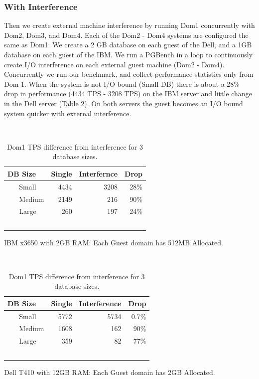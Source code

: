 \subsubsection{With Interference}
Then we create external machine interference by running Dom1 concurrently with Dom2, Dom3, and Dom4. Each of the Dom2 - Dom4 systems are configured the same as Dom1.  We create a 2 GB database on each guest of the Dell, and a 1GB database on each guest of the IBM.  We run a PGBench in a loop to continuously create I/O interference on each external guest machine (Dom2 - Dom4). Concurrently we run our benchmark, and collect performance statistics only from Dom-1.  When the system is not I/O bound (Small DB) there is about a 28\% drop in performance (4434 TPS - 3208 TPS) on the IBM server and little change in the Dell server (Table \ref{fig:tps1}).  On both servers the guest becomes an I/O bound system quicker with external interference.

\begin{table}[h]
\begin{subtable}[h]{0.45\textwidth}
  \begin{tabular}{ l | r | r | r }
    DB Size & Single & Interfernce & Drop \\
    \hline
    Small & 4434 & 3208 & 28\% \\ \hline
    Medium & 2149 & 216 & 90\% \\ \hline
    Large & 260 & 197 & 24\% \\  \hline
    \hline
  \end{tabular}
\caption{IBM x3650 with 2GB RAM:  Each Guest domain has 512MB Allocated.}
\end{subtable}
\hfill
\begin{subtable}[h]{0.45\textwidth}
  \begin{tabular}{ l | r | r | r }
    DB Size & Single & Interference & Drop \\
    \hline
    Small & 5772 & 5734 & 0.7\% \\ \hline
    Medium & 1608 & 162 & 90\% \\ \hline
    Large & 359 & 82 & 77\% \\  \hline
    \hline
  \end{tabular}
\caption{Dell T410 with 12GB RAM:  Each Guest domain has 2GB Allocated. }
\end{subtable}
\caption{Dom1 TPS difference from interference for 3 database sizes.}
\label{fig:tps1}
\end{table}

